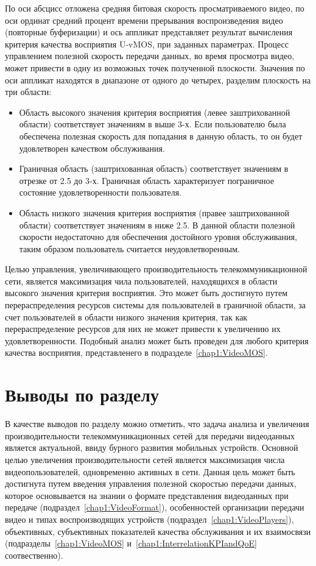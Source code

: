 По оси абсцисс отложена средняя битовая скорость просматриваемого видео, по оси ординат средний процент времени прерывания воспроизведения видео (повторные буферизации) и ось аппликат представляет результат вычисления критерия качества восприятия U-vMOS, при заданных параметрах. Процесс управлением полезной скорость передачи данных, во время просмотра видео, может привести в одну из возможных точек полученной плоскости. Значения по оси аппликат находятся в диапазоне от одного до четырех, разделим плоскость на три области:
\begin{itemize}
  \item Область высокого значения критерия восприятия (левее заштрихованной области) соответствует значениям в выше 3-х. Если пользователю была обеспечена полезная скорость для попадания в данную область, то он будет удовлетворен качеством обслуживания.
  \item Граничная область (заштрихованная область) соответствует значениям в отрезке от 2.5 до 3-х. Граничная область характеризует пограничное состояние удовлетворенности пользователя.
  \item Область низкого значения критерия восприятия (правее заштрихованной области) соответствует значениям в ниже 2.5. В данной области полезной скорости недостаточно для обеспечения достойного уровня обслуживания, таким образом пользователь считается неудовлетворенным.
\end{itemize}

Целью управления, увеличивающего производительность телекоммуникационной сети, является максимизация чила пользователей, находящихся в области высокого значения критерия восприятия. Это может быть достигнуто путем перераспределения ресурсов системы для пользователей в граничной области, за счет пользователей в области низкого значения критерия, так как перераспределение ресурсов для них не может привести к увеличению их удовлетворенности. Подобный анализ может быть проведен для любого критерия качества восприятия, представленего в подразделе~\ref{chap1:VideoMOS}.

\section{Выводы по разделу}

В качестве выводов по разделу можно отметить, что задача анализа и увеличения производительности телекоммуникационных сетей для передачи видеоданных является актуальной, ввиду бурного развития мобильных устройств. Основной целью увеличения производительности сетей является максимизация числа видеопользователей, одновременно активных в сети. Данная цель может быть достигнута путем введения управления полезной скоростью передачи данных, которое основывается на знании о формате представления видеоданных при передаче (подраздел~\ref{chap1:VideoFormat}), особенностей организации передачи видео и типах воспроизводящих устройств (подраздел~\ref{chap1:VideoPlayers}), объективных, субъективных показателей качества обслуживания и их взаимосвязи (подразделы~\ref{chap1:VideoMOS} и~\ref{chap1:InterrelationKPIandQoE} соотвественно).

